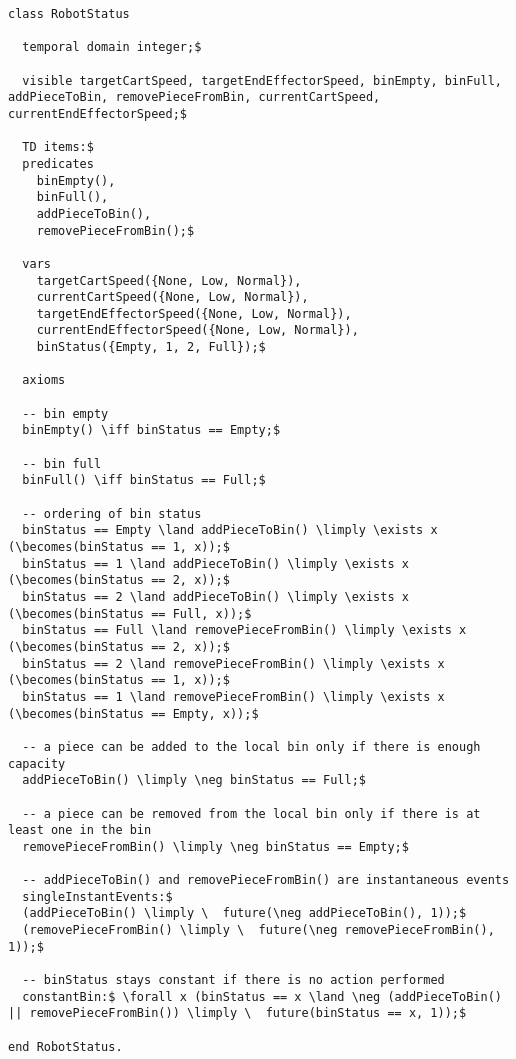 \begin{lstlisting}[fontadjust, mathescape, frame=tlb] 
class RobotStatus

  temporal domain integer;$

  visible targetCartSpeed, targetEndEffectorSpeed, binEmpty, binFull, addPieceToBin, removePieceFromBin, currentCartSpeed, currentEndEffectorSpeed;$

  TD items:$
  predicates
    binEmpty(),
    binFull(),
    addPieceToBin(),
    removePieceFromBin();$

  vars
    targetCartSpeed({None, Low, Normal}),
    currentCartSpeed({None, Low, Normal}),
    targetEndEffectorSpeed({None, Low, Normal}),
    currentEndEffectorSpeed({None, Low, Normal}),
    binStatus({Empty, 1, 2, Full});$

  axioms

  -- bin empty
  binEmpty() \iff binStatus == Empty;$

  -- bin full
  binFull() \iff binStatus == Full;$

  -- ordering of bin status
  binStatus == Empty \land addPieceToBin() \limply \exists x (\becomes(binStatus == 1, x));$
  binStatus == 1 \land addPieceToBin() \limply \exists x (\becomes(binStatus == 2, x));$
  binStatus == 2 \land addPieceToBin() \limply \exists x (\becomes(binStatus == Full, x));$
  binStatus == Full \land removePieceFromBin() \limply \exists x (\becomes(binStatus == 2, x));$
  binStatus == 2 \land removePieceFromBin() \limply \exists x (\becomes(binStatus == 1, x));$
  binStatus == 1 \land removePieceFromBin() \limply \exists x (\becomes(binStatus == Empty, x));$

  -- a piece can be added to the local bin only if there is enough capacity
  addPieceToBin() \limply \neg binStatus == Full;$

  -- a piece can be removed from the local bin only if there is at least one in the bin
  removePieceFromBin() \limply \neg binStatus == Empty;$

  -- addPieceToBin() and removePieceFromBin() are instantaneous events
  singleInstantEvents:$
  (addPieceToBin() \limply \  future(\neg addPieceToBin(), 1));$
  (removePieceFromBin() \limply \  future(\neg removePieceFromBin(), 1));$

  -- binStatus stays constant if there is no action performed
  constantBin:$ \forall x (binStatus == x \land \neg (addPieceToBin() || removePieceFromBin()) \limply \  future(binStatus == x, 1));$

end RobotStatus.\end{lstlisting}
